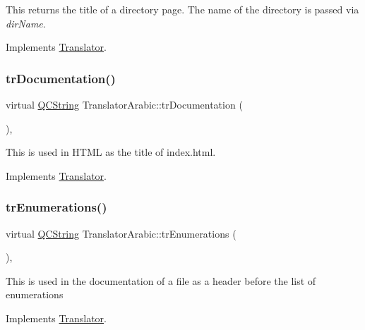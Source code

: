 This returns the title of a directory page. The name of the directory is passed via {\itshape dir\+Name}. 

Implements \mbox{\hyperlink{class_translator}{Translator}}.

\mbox{\label{class_translator_arabic_a1b58fe62b474d91b2128db010ebc973d}} 
\subsubsection{\texorpdfstring{trDocumentation()}{trDocumentation()}}
{\footnotesize\ttfamily virtual \mbox{\hyperlink{class_q_c_string}{Q\+C\+String}} Translator\+Arabic\+::tr\+Documentation (\begin{DoxyParamCaption}{ }\end{DoxyParamCaption})\hspace{0.3cm}{\ttfamily [inline]}, {\ttfamily [virtual]}}

This is used in H\+T\+ML as the title of index.\+html. 

Implements \mbox{\hyperlink{class_translator}{Translator}}.

\mbox{\label{class_translator_arabic_a326d79ef3895d320d904752ab72b48a2}} 
\subsubsection{\texorpdfstring{trEnumerations()}{trEnumerations()}}
{\footnotesize\ttfamily virtual \mbox{\hyperlink{class_q_c_string}{Q\+C\+String}} Translator\+Arabic\+::tr\+Enumerations (\begin{DoxyParamCaption}{ }\end{DoxyParamCaption})\hspace{0.3cm}{\ttfamily [inline]}, {\ttfamily [virtual]}}

This is used in the documentation of a file as a header before the list of enumerations 

Implements \mbox{\hyperlink{class_translator}{Translator}}.

\mbox{\label{class_translator_arabic_a098c2c8b18b1c2d449f08dd1b67f27c4}} 
